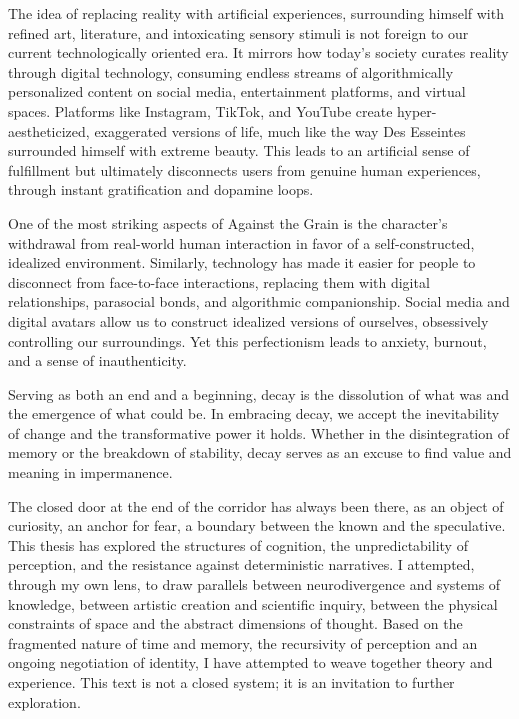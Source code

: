 The idea of replacing reality with artificial experiences, surrounding himself with refined art, literature, and intoxicating sensory stimuli is not foreign to our current technologically oriented era. It mirrors how today's society curates reality through digital technology, consuming endless streams of algorithmically personalized content on social media, entertainment platforms, and virtual spaces. Platforms like Instagram, TikTok, and YouTube create hyper-aestheticized, exaggerated versions of life, much like the way Des Esseintes surrounded himself with extreme beauty. This leads to an artificial sense of fulfillment but ultimately disconnects users from genuine human experiences, through instant gratification and dopamine loops.

One of the most striking aspects of Against the Grain is the character's withdrawal from real-world human interaction in favor of a self-constructed, idealized environment. Similarly, technology has made it easier for people to disconnect from face-to-face interactions, replacing them with digital relationships, parasocial bonds, and algorithmic companionship. Social media and digital avatars allow us to construct idealized versions of ourselves, obsessively controlling our surroundings. Yet this perfectionism leads to anxiety, burnout, and a sense of inauthenticity.

Serving as both an end and a beginning, decay is the dissolution of what was and the emergence of what could be. In embracing decay, we accept the inevitability of change and the transformative power it holds. Whether in the disintegration of memory or the breakdown of stability, decay serves as an excuse to find value and meaning in impermanence.


The closed door at the end of the corridor has always been there, as an object of curiosity, an anchor for fear, a boundary between the known and the speculative. This thesis has explored the structures of cognition, the unpredictability of perception, and the resistance against deterministic narratives. I attempted, through my own lens, to draw parallels between neurodivergence and systems of knowledge, between artistic creation and scientific inquiry, between the physical constraints of space and the abstract dimensions of thought. Based on the fragmented nature of time and memory, the recursivity of perception and an ongoing negotiation of identity, I have attempted to weave together theory and experience. This text is not a closed system; it is an invitation to further exploration. 